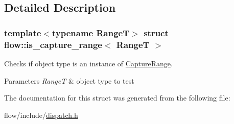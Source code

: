 \subsection{Detailed Description}
\subsubsection*{template$<$typename RangeT$>$\newline
struct flow\+::is\+\_\+capture\+\_\+range$<$ Range\+T $>$}

Checks if object type is an instance of \hyperlink{structflow_1_1_capture_range}{Capture\+Range}. 


\begin{DoxyParams}{Parameters}
{\em RangeT} & object type to test \\
\hline
\end{DoxyParams}


The documentation for this struct was generated from the following file\+:\begin{DoxyCompactItemize}
\item 
flow/include/\hyperlink{dispatch_8h}{dispatch.\+h}\end{DoxyCompactItemize}
